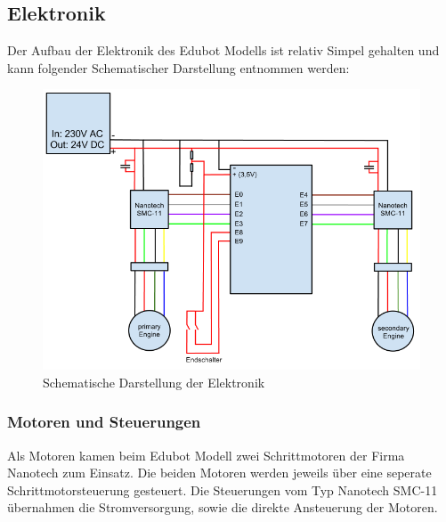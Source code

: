 \subsection{Elektronik}
Der Aufbau der Elektronik des Edubot Modells ist relativ Simpel gehalten und kann folgender Schematischer Darstellung entnommen werden:

\begin{figure}[H]
  \centering
  \begin{minipage}[t]{14 cm}
  	\centering
  	\includegraphics[width=14cm]{images/edubot_electronic} 
    \caption{Schematische Darstellung der Elektronik}
  \end{minipage}
\end{figure}

\subsubsection{Motoren und Steuerungen}
Als Motoren kamen beim Edubot Modell zwei Schrittmotoren der Firma Nanotech zum Einsatz. Die beiden Motoren werden jeweils über eine seperate Schrittmotorsteuerung gesteuert. Die Steuerungen vom Typ Nanotech SMC-11 übernahmen die Stromversorgung, sowie die direkte Ansteuerung der Motoren.

